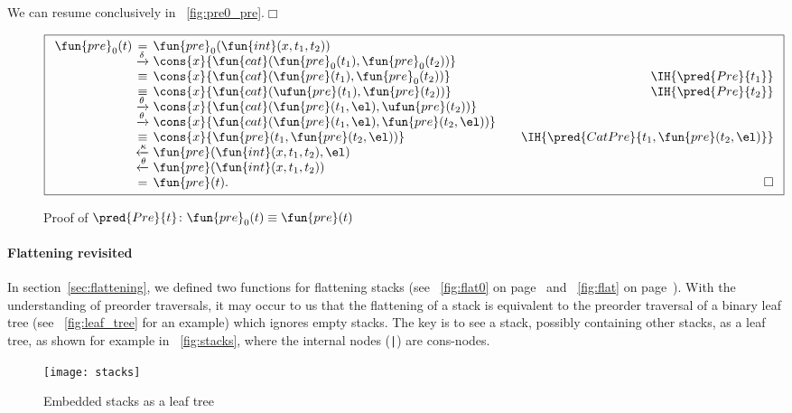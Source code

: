 We can resume conclusively in \fig~\vref{fig:pre0_pre}.\hfill\(\Box\)
\begin{figure}[]
\begin{equation*}
\boxed{%
\begin{array}{r@{\;}c@{\;}l@{\qquad}r}
\fun{pre}_0(t)
& = & \fun{pre}_0(\fun{int}(x,t_1,t_2))\\
& \xrightarrow{\smash{\delta}}
& \cons{x}{\fun{cat}(\fun{pre}_0(t_1), \fun{pre}_0(t_2))}\\
& \equiv & \cons{x}{\fun{cat}(\fun{pre}(t_1), \fun{pre}_0(t_2))}
& \IH{\pred{Pre}{t_1}}\\
& \equiv & \cons{x}{\fun{cat}(\ufun{pre}(t_1), \fun{pre}(t_2))}
& \IH{\pred{Pre}{t_2}}\\
& \xrightarrow{\smash{\theta}}
& \cons{x}{\fun{cat}(\fun{pre}(t_1,\el), \ufun{pre}(t_2))}\\
& \xrightarrow{\smash{\theta}}
& \cons{x}{\fun{cat}(\fun{pre}(t_1,\el), \fun{pre}(t_2,\el))}\\
& \equiv
& \cons{x}{\fun{pre}(t_1,\fun{pre}(t_2,\el))}
& \IH{\pred{CatPre}{t_1,\fun{pre}(t_2,\el)}}\\
& \xleftarrow{\smash{\kappa}}
& \fun{pre}(\fun{int}(x,t_1,t_2),\el)\\
& \xleftarrow{\smash{\theta}}
& \fun{pre}(\fun{int}(x,t_1,t_2))\\
& = & \fun{pre}(t). & \hfill\Box
\end{array}}
\end{equation*}
\caption{Proof of \(\pred{Pre}{t} \colon \fun{pre}_0(t) \equiv
  \fun{pre}(t)\)}
\label{fig:pre0_pre}
\end{figure}

\paragraph{Flattening revisited}

In section~\vref{sec:flattening}, we defined two functions for
flattening stacks (see \fig~\ref{fig:flat0} on
page~\pageref{fig:flat0} and \fig~\ref{fig:flat} on
page~\pageref{fig:flat}). With the understanding of preorder
traversals, it may occur to us that the flattening of a stack is
equivalent to the preorder traversal of a binary leaf
tree (see \fig~\vref{fig:leaf_tree} for
an example) which ignores empty stacks. The key is to see a stack,
possibly containing other stacks, as a leaf tree, as shown for example
in \fig~\vref{fig:stacks}, where the internal nodes (\texttt{|}) are
cons\hyp{}nodes.
\begin{figure}
\centering
\texttt{[image: stacks]}
\caption{Embedded stacks as a leaf tree}
\label{fig:stacks}
\end{figure}

